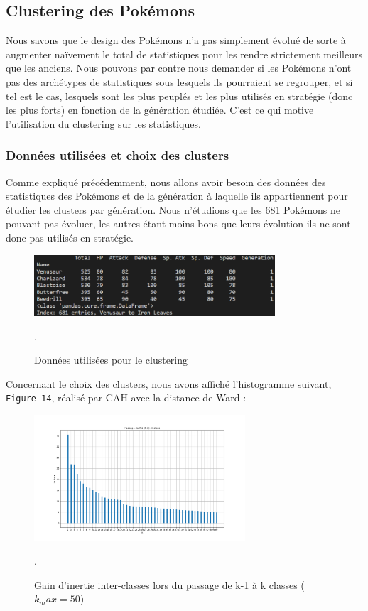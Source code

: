 \documentclass[a4paper,12pt]{article}
\begin{document}
\subsection{Clustering des Pokémons}
Nous savons que le design des Pokémons n'a pas simplement évolué de sorte à augmenter naïvement le total de statistiques pour les rendre strictement meilleurs que les anciens. Nous pouvons par contre nous demander si les Pokémons n'ont pas des archétypes de statistiques sous lesquels ils pourraient se regrouper, et si tel est le cas, lesquels sont les plus peuplés et les plus utilisés en stratégie (donc les plus forts) en fonction de la génération étudiée. C'est ce qui motive l'utilisation du clustering sur les statistiques.

\subsubsection{Données utilisées et choix des clusters}
Comme expliqué précédemment, nous allons avoir besoin des données des statistiques des Pokémons et de la génération à laquelle ils appartiennent pour étudier les clusters par génération. Nous n'étudions que les 681 Pokémons ne pouvant pas évoluer, les autres étant moins bons que leurs évolution ils ne sont donc pas utilisés en stratégie.

\begin{figure}[h]
    \centering
    \includegraphics[width=0.8\textwidth]{Clustering/stats_gen_infos.png}
    \caption{Données utilisées pour le clustering}.
\end{figure}

Concernant le choix des clusters, nous avons affiché l'histogramme suivant, \texttt{Figure 14}, réalisé par CAH avec la distance de Ward : 

\begin{figure}[h]
    \centering
    \includegraphics[width=0.7\textwidth]{Clustering/heights_k_clustering_zoomed.png}
    \caption{Gain d'inertie inter-classes lors du passage de k-1 à k classes ($k_max = 50$)}.
\end{figure}
\end{document}
